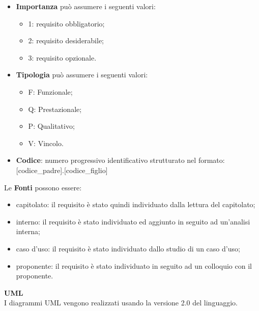 \begin{itemize}
	\item \textbf{Importanza} può assumere i seguenti valori:
	\begin{itemize}
		\item 1: requisito obbligatorio;
		\item 2: requisito desiderabile;
		\item 3: requisito opzionale.
	\end{itemize}
	\item \textbf{Tipologia} può assumere i seguenti valori:
	\begin{itemize}
		\item F: Funzionale;
		\item Q: Prestazionale;
		\item P: Qualitativo;
		\item V: Vincolo.
	\end{itemize}
	\item\textbf{Codice}: numero progressivo identificativo strutturato nel formato: [codice\_padre].[codice\_figlio]
\end{itemize}
Le \textbf{Fonti} possono essere:
\begin{itemize}
	\item capitolato\glo: il requisito è stato quindi individuato dalla lettura del capitolato\glo;
	\item interno: il requisito è stato individuato ed aggiunto in seguito ad un'analisi interna;
	\item caso d'uso: il requisito è stato individuato dallo studio di un caso d'uso;
	\item proponente: il requisito è stato individuato in seguito ad un colloquio con il proponente.
\end{itemize}
\textbf{UML} \\
I diagrammi UML vengono realizzati usando la versione 2.0 del linguaggio.
